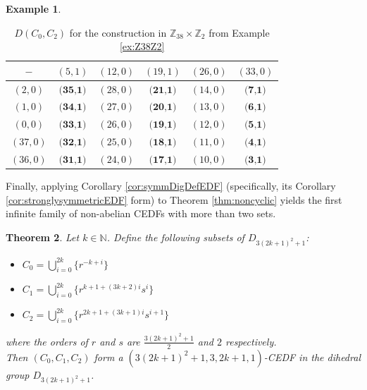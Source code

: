 \documentclass[12pt, a4paper]{article}
\newtheorem{theorem}{Theorem}[section]
\theoremstyle{definition}
\newtheorem{example}[theorem]{Example}
\begin{document}
\begin{example}
\begin{table}[h]
\caption{$D(C_2,C_1)$ for the construction in $\mathbb{Z}_{38} \times \mathbb{Z}_2$ from Example \ref{ex:Z38Z2}}
\label{table:C_2C_1}
\end{table}

\begin{table}[h]
\renewcommand{\arraystretch}{1.2}
\centering
\setlength\tabcolsep{3pt}
\begin{tabular}{|c|ccccc|} 
\hline
$-$ & $(5,1)$ & $(12,0)$ & $(19,1)$ & $(26,0)$ & $(33,0)$ \\ \hline
$(2,0)$ & $ \textbf{(35,1)}$	& $(28,0)$ & $\textbf{(21,1)}$ & $(14,0)$	& $\textbf{(7,1)}$ \\
$(1,0)$ & $ \textbf{(34,1)}$ & $(27,0)$ & $	\textbf{(20,1)}	$ & $(13,0)	$ & $\textbf{(6,1)}$ \\
$(0,0)$ & $ \textbf{(33,1)}$	& $(26,0)$ & $\textbf{(19,1)}$ & $(12,0)$	& $\textbf{(5,1)}$ \\
$(37,0)$ & $ \textbf{(32,1)}$ & $(25,0)$ & $	\textbf{(18,1)}	$ & $(11,0)	$ & $\textbf{(4,1)}$ \\
$(36,0)$ & $ \textbf{(31,1)}$	& $(24,0)$ & $\textbf{(17,1)}$ & $(10,0)$	& $\textbf{(3,1)}$ \\
\hline
\end{tabular}
	
\caption{$D(C_0,C_2)$ for the construction in $\mathbb{Z}_{38} \times \mathbb{Z}_2$ from Example \ref{ex:Z38Z2}}
\label{table:C_0C_2}
\end{table}
\end{example}

Finally, applying Corollary \ref {cor:symmDigDefEDF} (specifically, its Corollary \ref{cor:stronglysymmetricEDF} form) to Theorem \ref{thm:noncyclic} yields the first infinite family of non-abelian CEDFs with more than two sets.
\begin{theorem}\label{thm:dihedral}
Let $k \in \mathbb{N}$. Define the following subsets of $D_{3(2k+1)^2+1}$:
\begin{itemize}
\item $C_0=\bigcup_{i=0}^{2k}\{r^{-k+i}\}$
\item $C_1=\bigcup_{i=0}^{2k}\{r^{k+1+(3k+2)i}s^i\}$
\item $C_2=\bigcup_{i=0}^{2k}\{r^{2k+1+(3k+1)i}s^{i+1}\}$
\end{itemize}
where the orders of $r$ and $s$ are $\frac{3(2k+1)^2+1}{2}$ and $2$ respectively.\\
Then $(C_0,C_1,C_2)$ form a $(3(2k+1)^2+1,3,2k+1,1)$-CEDF in the dihedral group $D_{3(2k+1)^2+1}$.
\end{theorem}
\end{document}
